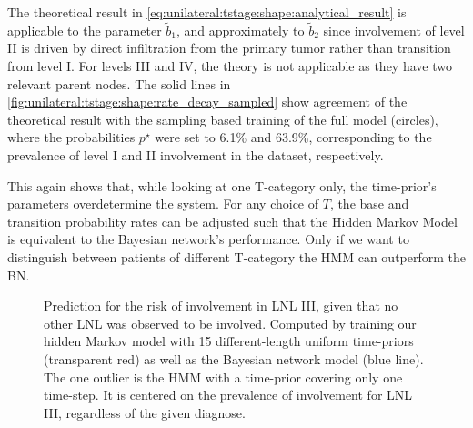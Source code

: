 \documentclass[\relativeRoot/main.tex]{subfiles}
\begin{document}
The theoretical result in \cref{eq:unilateral:tstage:shape:analytical_result} is applicable to the parameter $\tilde{b}_1$, and approximately to $\tilde{b}_2$ since involvement of level II is driven by direct infiltration from the primary tumor rather than transition from level I. For levels III and IV, the theory is not applicable as they have two relevant parent nodes. The solid lines in \cref{fig:unilateral:tstage:shape:rate_decay_sampled} show agreement of the theoretical result with the sampling based training of the full model (circles), where the probabilities $p^{\star}$ were set to 6.1\% and 63.9\%, corresponding to the prevalence of level I and II involvement in the dataset, respectively.


This again shows that, while looking at one T-category only, the time-prior's parameters overdetermine the system. For any choice of $T$, the base and transition probability rates can be adjusted such that the Hidden Markov Model is equivalent to the Bayesian network's performance. Only if we want to distinguish between patients of different T-category the HMM can outperform the BN.

\begin{figure}
    \centering
    \def\svgwidth{0.7\textwidth}
    
    \caption{Prediction for the risk of involvement in LNL III, given that no other LNL was observed to be involved. Computed by training our hidden Markov model with 15 different-length uniform time-priors (transparent red) as well as the Bayesian network model (blue line). The one outlier is the HMM with a time-prior covering only one time-step. It is centered on the prevalence of involvement for LNL III, regardless of the given diagnose.}
    \label{fig:unilateral:tstage:shape:multi_length_risk}
\end{figure}
\end{document}
